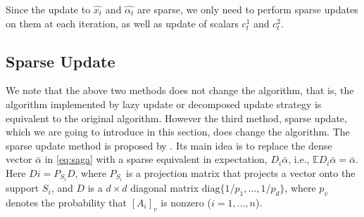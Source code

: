 \documentclass{article}
\begin{document}
\bigbreak

Since the update to $\hat{x_t}$ and
$\hat{\alpha_t}$ %
are sparse, we only need to perform sparse updates on them at each iteration, as well as update of scalars $c_t^1$ and $c_t^2$.


\subsection{Sparse Update}
We note that the above two methods does not change the algorithm, that is, the algorithm implemented by lazy update or decomposed update strategy is equivalent to the original algorithm. However the third method, sparse update, which we are going to introduce in this section, does change the algorithm. The sparse update method is proposed by \cite{mania2015}. Its main idea is to replace the dense vector $\bar{\alpha}$ in \eqref{eq:saga} with a sparse equivalent in expectation, $D_i \bar{\alpha}$, i.e., $\mathbb{E} D_i \bar{\alpha} = \bar{\alpha}$. Here $Di = P_{S_i} D$, where $P_{S_i}$ is a projection matrix that projects a vector onto the support $S_i$, and $D$ is a  $d \times d$ diagonal matrix $\mathrm{diag}\{1/p_1, \dots, 1/p_d\}$, where $p_v$ denotes the probability that $[A_i]_v$ is nonzero ($i=1, \dots, n$).



\end{document}
